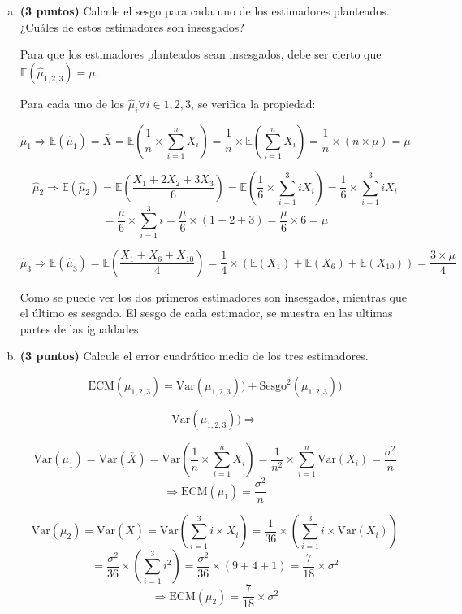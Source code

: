 \documentclass[../main.tex]{subfiles}
\begin{document}
\begin{enumerate}[(a)]

\item \textbf{(3 puntos)} Calcule el sesgo para cada uno de los estimadores planteados. ¿Cuáles de estos estimadores son insesgados?

Para que los estimadores planteados sean insesgados, debe ser cierto que $\mathbb{E}(\hat{\mu}_{1,2,3}) = \mu$.

Para cada uno de los $\hat{\mu}_i \forall i \in {1,2,3}$, se verifica la propiedad:

$$\hat{\mu}_1 \Rightarrow \mathbb{E}(\hat{\mu}_1) = \bar{X} = \mathbb{E} \left( \frac{1}{n} \times \sum_{i = 1}^{n} X_{i} \right) =  \frac{1}{n} \times \mathbb{E} \left(  \sum_{i = 1}^{n} X_{i} \right) = \frac{1}{n} \times (n \times \mu) = \mu$$

$$\hat{\mu}_2 \Rightarrow \mathbb{E}(\hat{\mu}_2) = \mathbb{E} \left( \frac{X_1 + 2X_2 + 3X_3}{6}\right) = \mathbb{E} \left( \frac{1}{6} \times \sum_{i = 1}^{3} iX_i\right) =  \frac{1}{6} \times \sum_{i = 1}^{3} iX_i $$
$$= \frac{\mu}{6} \times \sum_{i = 1}^{3} i  = \frac{\mu}{6} \times (1 + 2 + 3) = \frac{\mu}{6} \times 6 = \mu$$

$$\hat{\mu}_3 \Rightarrow \mathbb{E}(\hat{\mu}_3) = \mathbb{E} \left( \frac{X_1 + X_6 + X_{10}}{4}\right) = \frac{1}{4} \times (\mathbb{E}(X_{1}) + \mathbb{E}(X_{6}) + \mathbb{E}(X_{10})) = \frac{3 \times \mu}{4}$$

Como se puede ver los dos primeros estimadores son insesgados, mientras que el último es sesgado. El sesgo de cada estimador, se muestra en las ultimas partes de las igualdades.

\item \textbf{(3 puntos)} Calcule el error cuadrático medio de los tres estimadores.

$$\text{ECM}(\mu_{1,2,3}) = \text{Var}(\mu_{1,2,3})) + \text{Sesgo}^2(\mu_{1,2,3}))$$

$$ \text{Var}(\mu_{1,2,3})) \Rightarrow $$

$$ \text{Var}(\mu_{1}) =  \text{Var}(\bar{X}) = \text{Var} \left( \frac{1}{n} \times \sum_{i =  1}^{n} X_{i} \right) = \frac{1}{n^2} \times    \sum_{i =  1}^{n} \text{Var} \left( X_{i}\right) = \frac{\sigma ^2}{n}$$
$$\Rightarrow \text{ECM}(\mu_{1}) = \frac{\sigma ^2}{n}$$

$$ \text{Var}(\mu_{2}) =  \text{Var}(\bar{X}) =  \text{Var} \left(\sum_{i =  1}^{3} i \times X_{i} \right) = \frac{1}{36} \times  \left(\sum_{i =  1}^{3} i \times \text{Var}(X_{i}) \right)$$
$$=  \frac{\sigma ^2}{36} \times  \left(\sum_{i =  1}^{3} i ^2 \right) = \frac{\sigma ^2}{36} \times  (9 + 4 + 1) = \frac{7}{18} \times \sigma ^2 $$
$$\Rightarrow \text{ECM}(\mu_{2}) =  \frac{7}{18} \times \sigma ^2$$


\end{enumerate}
\end{document}

